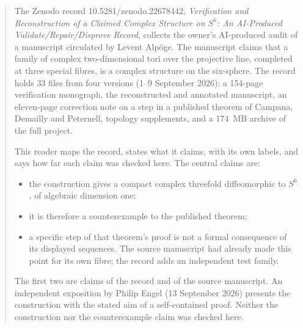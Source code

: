 \begin{abstract}
\noindent
The Zenodo record 10.5281/zenodo.22678442, \emph{Verification and Reconstruction of a Claimed Complex Structure on $S^6$: An AI-Produced Validate/Repair/Disprove Record}, collects the owner's AI-produced audit of a manuscript circulated by Levent Alpöge. The manuscript claims that a family of complex two-dimensional tori over the projective line, completed at three special fibres, is a complex structure on the six-sphere. The record holds 33 files from four versions (1--9 September 2026): a 154-page verification monograph, the reconstructed and annotated manuscript, an eleven-page correction note on a step in a published theorem of Campana, Demailly and Peternell, topology supplements, and a 174~MB archive of the full project.

This reader maps the record, states what it claims, with its own labels, and says how far each claim was checked here. The central claims are:
\begin{itemize}
\item the construction gives a compact complex threefold diffeomorphic to $S^6$, of algebraic dimension one;
\item it is therefore a counterexample to the published theorem;
\item a specific step of that theorem's proof is not a formal consequence of its displayed sequences. The source manuscript had already made this point for its own fibre; the record adds an independent test family.
\end{itemize}
The first two are claims of the record and of the source manuscript. An independent exposition by Philip Engel (13 September 2026) presents the construction with the stated aim of a self-contained proof. Neither the construction nor the counterexample claim was checked here.


\end{abstract}

